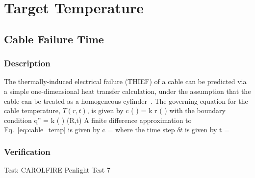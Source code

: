 
\chapter{Target Temperature}
\label{Target_Temperature_Chapter}

\section{Cable Failure Time}

\subsection*{Description}

The thermally-induced electrical failure (THIEF) of a cable can be predicted via a simple
one-dimensional heat transfer calculation, under the assumption that the cable can be
treated as a homogeneous cylinder~\cite{CAROLFIRE}. The governing equation for the cable temperature,
$T(r,t)$, is given by
\be
\rho c \left(  \right) =   k r \left(  \right)
\label{eq:cable_temp}
\ee
with the boundary condition
\be
\dot q'' = k \left(  \right) (R,t)
\ee
A finite difference approximation to Eq.~\ref{eq:cable_temp} is given by
\be
\rho c  =   
\ee
where the time step $\delta t$ is given by
\be
\delta t = 
\ee

\subsection*{Verification}

Test: CAROLFIRE Penlight Test 7

